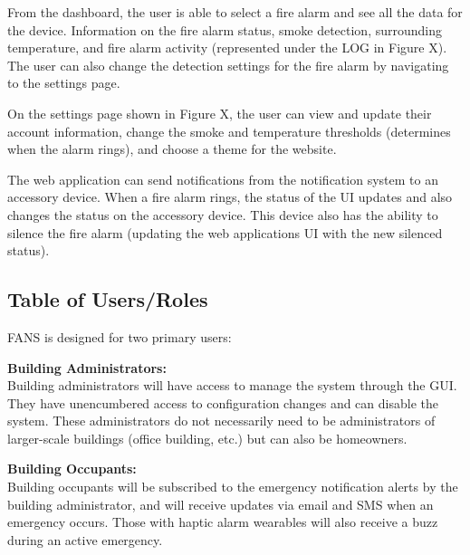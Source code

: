 From the dashboard, the user is able to select a fire alarm and see all the data for the device. Information on the
fire alarm status, smoke detection, surrounding temperature, and fire alarm activity (represented under the LOG in
Figure X). The user can also change the detection settings for the fire alarm by navigating to the settings page.

On the settings page shown in Figure X, the user can view and update their account information, change the smoke and
temperature thresholds (determines when the alarm rings), and choose a theme for the website.

The web application can send notifications from the notification system to an accessory device. When a fire alarm
rings, the status of the UI updates and also changes the status on the accessory device. This device also has the
ability to silence the fire alarm (updating the web applications UI with the new silenced status).

\subsection{Table of Users/Roles}

FANS is designed for two primary users:

\textbf{Building Administrators:} \\
Building administrators will have access to manage the system through the GUI. They have unencumbered access to configuration changes and can disable the system. These administrators do not necessarily need to be administrators of larger-scale buildings (office building, etc.) but can also be homeowners.

\textbf{Building Occupants:} \\
Building occupants will be subscribed to the emergency notification alerts by the building administrator, and will receive updates via email and SMS when an emergency occurs. Those with haptic alarm wearables will also receive a buzz during an active emergency.
